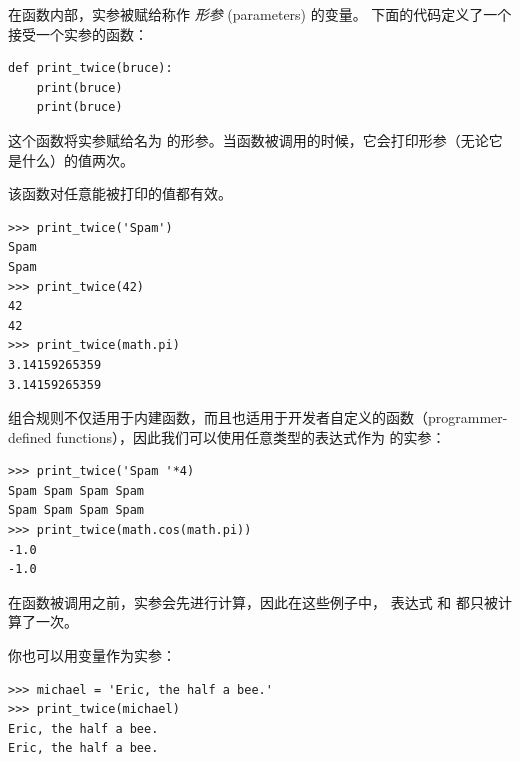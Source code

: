 在函数内部，实参被赋给称作 {\em 形参} (parameters) 的变量。
下面的代码定义了一个接受一个实参的函数：

\begin{lstlisting}
def print_twice(bruce):
    print(bruce)
    print(bruce)
\end{lstlisting}

%

这个函数将实参赋给名为  的形参。当函数被调用的时候，它会打印形参（无论它是什么）的值两次。


该函数对任意能被打印的值都有效。

\begin{lstlisting}
>>> print_twice('Spam')
Spam
Spam
>>> print_twice(42)
42
42
>>> print_twice(math.pi)
3.14159265359
3.14159265359
\end{lstlisting}

%

组合规则不仅适用于内建函数，而且也适用于开发者自定义的函数（programmer-defined functions），因此我们可以使用任意类型的表达式作为  的实参：
  

\begin{lstlisting}
>>> print_twice('Spam '*4)
Spam Spam Spam Spam
Spam Spam Spam Spam
>>> print_twice(math.cos(math.pi))
-1.0
-1.0
\end{lstlisting}

%

在函数被调用之前，实参会先进行计算，因此在这些例子中，
表达式  和  都只被计算了一次。


你也可以用变量作为实参：

\begin{lstlisting}
>>> michael = 'Eric, the half a bee.'
>>> print_twice(michael)
Eric, the half a bee.
Eric, the half a bee.
\end{lstlisting}

